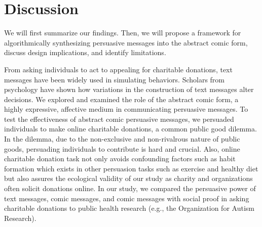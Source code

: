 \section{Discussion}
\label{sec:Discussion}
We will first summarize our findings. Then, we will propose a framework for algorithmically synthesizing persuasive messages into the abstract comic form, discuss design implications, and identify limitations.

From asking individuals to act to appealing for charitable donations, text messages have been widely used in simulating behaviors. Scholars from psychology have shown how variations in the construction of text messages alter decisions. We explored and examined the role of the abstract comic form, a highly expressive, affective medium in communicating persuasive messages. To test the effectiveness of abstract comic persuasive messages, we persuaded individuals to make online charitable donations, a common public good dilemma. In the dilemma, due to the non-exclusive and non-rivalrous nature of public goods, persuading individuals to contribute is hard and crucial. Also, online charitable donation task not only avoids confounding factors such as habit formation which exists in other persuasion tasks such as exercise and healthy diet but also assures the ecological validity of our study as charity and organizations often solicit donations online. In our study, we compared the persuasive power of text messages, comic messages, and comic messages with social proof in asking charitable donations to public health research (e.g., the Organization for Autism Research).

